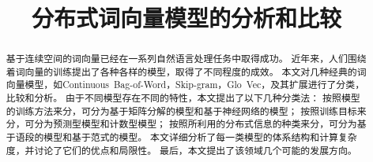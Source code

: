 \documentclass{llncs}
\title{分布式词向量模型的分析和比较}
\author{}
\institute{}
\begin{document}
\maketitle

\begin{abstract}
  基于连续空间的词向量已经在一系列自然语言处理任务中取得成功。
  近年来，人们围绕着词向量的训练提出了各种各样的模型，取得了不同程度的成效。
  本文对几种经典的词向量模型，如Continuous~Bag-of-Word，Skip-gram，Glo~Vec，及其扩展进行了分类，比较和分析。
  由于不同模型存在不同的特性，本文提出了以下几种分类法：
  按照模型的训练方法来分，可分为基于矩阵分解的模型和基于神经网络的模型；
  按照训练目标来分，可分为预测型模型和计数型模型；
  按照所利用的分布式信息的种类来分，可分为基于语段的模型和基于范式的模型。
  本文详细分析了每一类模型的体系结构和计算复杂度，并讨论了它们的优点和局限性。
  最后，本文提出了该领域几个可能的发展方向。
\end{abstract}









\end{document}
